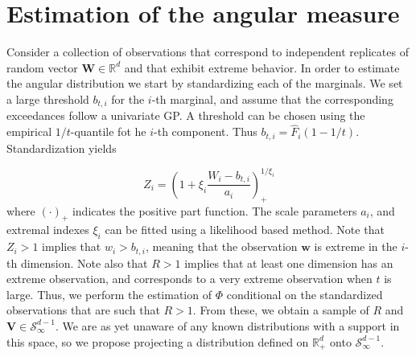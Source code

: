 \section{Estimation of the angular measure}

Consider a collection of observations that correspond to independent replicates of  random vector $\bm{W}\in {\mathbb R}^d$ and that exhibit extreme behavior. In order to estimate the angular distribution we start by standardizing each of the marginals. We set a large threshold $b_{t,i}$ for the $i$-th marginal, and assume that the corresponding exceedances follow a univariate GP. A threshold can be chosen using the empirical $1/t$-quantile fot he $i$-th component. Thus $b_{t,i} = \hat{F}_i(1 - 1/t)$. Standardization yields

\begin{equation}
    \label{eqn:standardization}
    Z_{i} = \left(1 + \xi_{i}\frac{W_{i} - b_{t,i}}{a_{i}}\right)_{+}^{1/\xi_{i}}
\end{equation}
  where $(\cdot)_{+}$ indicates the positive part function. The scale parameters $a_{i}$, and extremal indexes $\xi_{i}$ can be fitted using a likelihood based method.
 Note that $Z_{i} > 1$ implies that $w_{i} > b_{t,i}$, meaning that the observation
  $\bm{w}$ is extreme in the $i$-th dimension.  Note also that $R>1$ implies that at least one dimension has an extreme observation, and corresponds to a very extreme observation when $t$ is large. Thus, we perform the estimation of $\Phi$ conditional on the standardized observations that are such that $R>1$. From these, we obtain a sample of $R$ and
  $\bm{V}\in\mathcal{S}_{\infty}^{d-1}$. We are as yet unaware of any known distributions with a support
  in this space, so we propose projecting a distribution defined on ${\mathbb R}_{+}^{d}$ onto
  $\mathcal{S}_{\infty}^{d-1}$.

  

  

  
